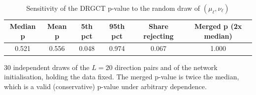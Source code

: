 \begin{table}[htbp]
\centering
\caption{Sensitivity of the DRGCT p-value to the random draw of $(\mu_\ell,\nu_\ell)$}
\label{tab:stability}
\small
\begin{tabular}{cccccc}
\toprule
Median p & Mean p & 5th pct & 95th pct & Share rejecting & Merged p (2x median) \\
\midrule
0.521 & 0.556 & 0.048 & 0.974 & 0.067 & 1.000 \\
\bottomrule
\end{tabular}

\begin{minipage}{\linewidth}\footnotesize
30 independent draws of the $L=20$ direction pairs and of the network initialisation, holding the data fixed.  The merged p-value is twice the median, which is a valid (conservative) p-value under arbitrary dependence.
\end{minipage}
\end{table}
